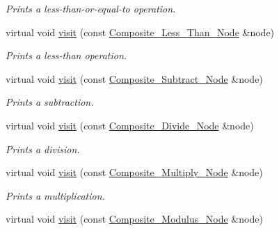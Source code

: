 \begin{DoxyCompactItemize}
\begin{DoxyCompactList}\small\item\em Prints a less-\/than-\/or-\/equal-\/to operation. \item\end{DoxyCompactList}\item 
virtual void \hyperlink{classMadara_1_1Expression__Tree_1_1Print__Visitor_a160734722c1d50d3ba17c925174f3e7f}{visit} (const \hyperlink{classMadara_1_1Expression__Tree_1_1Composite__Less__Than__Node}{Composite\_\-Less\_\-Than\_\-Node} \&node)
\begin{DoxyCompactList}\small\item\em Prints a less-\/than operation. \item\end{DoxyCompactList}\item 
virtual void \hyperlink{classMadara_1_1Expression__Tree_1_1Print__Visitor_a7b940fde6c08b239298977c79f0e6b04}{visit} (const \hyperlink{classMadara_1_1Expression__Tree_1_1Composite__Subtract__Node}{Composite\_\-Subtract\_\-Node} \&node)
\begin{DoxyCompactList}\small\item\em Prints a subtraction. \item\end{DoxyCompactList}\item 
virtual void \hyperlink{classMadara_1_1Expression__Tree_1_1Print__Visitor_ac39c07dbc0276afdea3031779d55c5fd}{visit} (const \hyperlink{classMadara_1_1Expression__Tree_1_1Composite__Divide__Node}{Composite\_\-Divide\_\-Node} \&node)
\begin{DoxyCompactList}\small\item\em Prints a division. \item\end{DoxyCompactList}\item 
virtual void \hyperlink{classMadara_1_1Expression__Tree_1_1Print__Visitor_a54d4952833230fc26b009d35b60730a9}{visit} (const \hyperlink{classMadara_1_1Expression__Tree_1_1Composite__Multiply__Node}{Composite\_\-Multiply\_\-Node} \&node)
\begin{DoxyCompactList}\small\item\em Prints a multiplication. \item\end{DoxyCompactList}\item 
virtual void \hyperlink{classMadara_1_1Expression__Tree_1_1Print__Visitor_abdf8d85687e7c6a143759a04bd052048}{visit} (const \hyperlink{classMadara_1_1Expression__Tree_1_1Composite__Modulus__Node}{Composite\_\-Modulus\_\-Node} \&node)

\end{DoxyCompactItemize}
